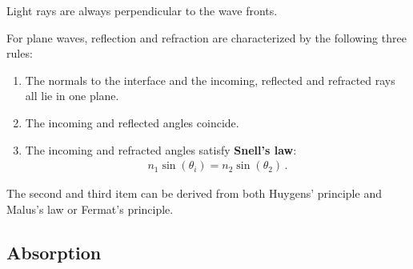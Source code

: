     \begin{theorem}
        Light rays are always perpendicular to the wave fronts.
    \end{theorem}

    \begin{property}
        For plane waves, reflection and refraction are characterized by the following three rules:
        \begin{enumerate}
            \item The normals to the interface and the incoming, reflected and refracted rays all lie in one plane.
            \item The incoming and reflected angles coincide.
            \item The incoming and refracted angles satisfy \textbf{Snell's law}:
            \begin{gather}
                n_1\sin(\theta_i)=n_2\sin(\theta_2)\,.
            \end{gather}
        \end{enumerate}
        The second and third item can be derived from both Huygens' principle and Malus's law or Fermat's principle.
    \end{property}

\subsection{Absorption}

